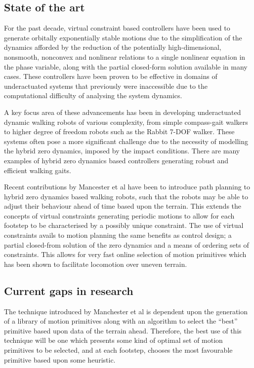 \subsection{State of the art}
For the past decade, virtual constraint based controllers have been used to generate orbitally exponentially stable motions due to the simplification of the dynamics afforded by the reduction of the potentially high-dimensional, nonsmooth, nonconvex and  nonlinear relations to a single nonlinear equation in the phase variable, along with the partial closed-form solution available in many cases. These controllers have been proven to be effective in domains of underactuated systems that previously were inaccessible due to the computational difficulty of analysing the system dynamics. 

A key focus area of these advancements has been in developing underactuated dynamic walking robots of various complexity, from simple compass-gait walkers to higher degree of freedom robots such as the Rabbit 7-DOF walker. These systems often pose a more significant challenge due to the necessity of modelling the hybrid zero dynamics, imposed by the impact conditions. There are many examples of hybrid zero dynamics based controllers generating robust and efficient walking gaits. 

Recent contributions by Mancester et al \cite{manchester13planning} have been to introduce path planning to hybrid zero dynamics based walking robots, such that the robots may be able to adjust their behaviour ahead of time based upon the terrain. This extends the concepts of virtual constraints generating periodic motions to allow for each footstep to be characterised by a possibly unique constraint. The use of virtual constraints avails to motion planning the same benefits as control design; a partial closed-from solution of the zero dynamics and a means of ordering sets of constraints. This allows for very fast online selection of motion primitives which has been shown to facilitate locomotion over uneven terrain.

\subsection{Current gaps in research}
The technique introduced by Manchester et al \cite{manchester13planning} is dependent upon the generation of a library of motion primitives along with an algorithm to select the ``best'' primitive based upon data of the terrain ahead. Therefore, the best use of this technique will be one which presents some kind of optimal set of motion primitives to be selected, and at each footstep, chooses the most favourable primitive based upon some heuristic. 

